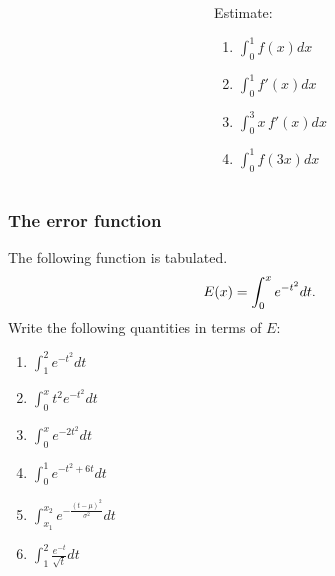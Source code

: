 \documentclass[14pt]{beamer}
\newcommand {\DS} [1] {${\displaystyle #1}$}
\newcommand{\p}{\pause}
\newcommand{\vv}{\vspace{.2cm}}
\begin{document}
\begin{frame}[t]
\begin{columns}
\begin{column}{.7\textwidth}
\begin{center}
\end{center}
\end{column}

\begin{column}{.32\textwidth}
Estimate:
	\begin{enumerate}
		\item  \DS{\int_0^1 f(x) dx}
		\item  \DS{\int_0^1 f'(x) dx}
		\item  \DS{\int_0^3 x \, f'(x) dx}
		\item \DS{\int_0^1 f(3x) dx}
	\end{enumerate}
\end{column}
\end{columns}

\end{frame}
\begin{frame}[t]
\frametitle{The error function} 

The following function	is tabulated.
	$$
		{\Large E(x) =  \int_0^x e^{-t^2} dt}.
	$$
Write the following quantities in terms of $E$:

\begin{multicols}{2}
	\begin{enumerate}
		\item \DS{\int_1^{2} e^{-t^2} dt}
		
		\vv
		\item \DS{\int_0^x t^2 e^{-t^2} dt}
		
		\vv
		\item  \DS{\int_0^x e^{-2t^2} dt}
		
		\vv
\p		\item  \DS{\int_0^1  e^{-t^2+6t} dt}
		
		\vv
		\item  \DS{\int_{x_1}^{x_2}  e^{-\frac{(t- \mu)^2}{\sigma^2}} dt}

		\vv
		\item  \DS{\int_1^2 \frac{e^{-t}}{\sqrt{t}} dt}
	\end{enumerate}
\end{multicols}

\end{frame}
\end{document}
